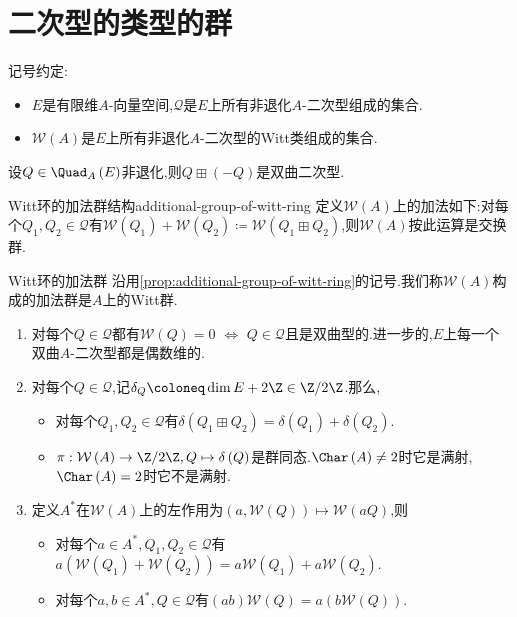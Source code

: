 \section{二次型的类型的群}

记号约定:
\begin{itemize}
	\item $E$是有限维$A$-向量空间,$\mathcal{Q}$是$E$上所有非退化$A$-二次型组成的集合.
	\item $\mathcal{W}\left(A\right)$是$E$上所有非退化$A$-二次型的Witt类组成的集合.
\end{itemize}


\begin{lemma}{}{}
	设$Q\in\Quad_{A}\left(E\right)$非退化,则$Q\boxplus\left(-Q\right)$是双曲二次型.
\end{lemma}

\begin{proposition}{Witt环的加法群结构}{additional-group-of-witt-ring}
	定义$\mathcal{W}\left(A\right)$上的加法如下:对每个$Q_{1},Q_{2}\in\mathcal{Q}$有$\mathcal{W}\left(Q_{1}\right)+\mathcal{W}\left(Q_{2}\right)\coloneq\mathcal{W}\left(Q_{1}\boxplus Q_{2}\right)$,则$\mathcal{W}\left(A\right)$按此运算是交换群.
\end{proposition}

\begin{definition}{Witt环的加法群}{}
	沿用\cref{prop:additional-group-of-witt-ring}的记号.我们称$\mathcal{W}\left(A\right)$构成的加法群是$A$上的Witt群.
\end{definition}

\begin{remark}{}{}
	\begin{enumerate}
		\item 对每个$Q\in\mathcal{Q}$都有$\mathcal{W}\left(Q\right)=0$ $\iff$ $Q\in\mathcal{Q}$且是双曲型的.进一步的,$E$上每一个双曲$A$-二次型都是偶数维的.
		\item 对每个$Q\in\mathcal{Q}$,记$\delta_{Q}\coloneq\dim E+2\Z\in\Z/2\Z$.那么,
		\begin{itemize}
			\item 对每个$Q_{1},Q_{2}\in\mathcal{Q}$有$\delta\left(Q_{1}\boxplus Q_{2}\right)=\delta\left(Q_{1}\right)+\delta\left(Q_{2}\right)$.
			\item $\pi:\mathcal{W}\left(A\right)\to\Z/2\Z,Q\mapsto\delta\left(Q\right)$是群同态.$\Char\left(A\right)\neq 2$时它是满射,$\Char\left(A\right)=2$时它不是满射.
		\end{itemize}
		\item 定义$A^{\ast}$在$\mathcal{W}\left(A\right)$上的左作用为$\left(a,\mathcal{W}\left(Q\right)\right)\mapsto\mathcal{W}\left(aQ\right)$,则
		\begin{itemize}
			\item 对每个$a\in A^{\ast},Q_{1},Q_{2}\in\mathcal{Q}$有$a\left(\mathcal{W}\left(Q_{1}\right)+\mathcal{W}\left(Q_{2}\right)\right)=a\mathcal{W}\left(Q_{1}\right)+a\mathcal{W}\left(Q_{2}\right)$.
			\item 对每个$a,b\in A^{\ast},Q\in\mathcal{Q}$有$\left(ab\right)\mathcal{W}\left(Q\right)=a\left(b\mathcal{W}\left(Q\right)\right)$.
		\end{itemize}
	\end{enumerate}
\end{remark}

